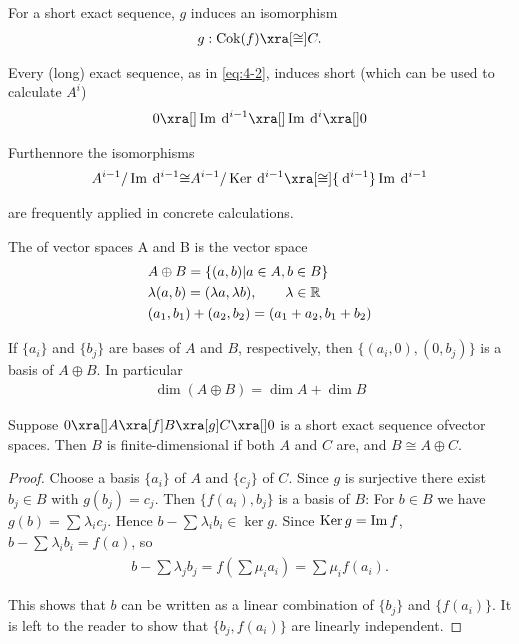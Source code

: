 For a short exact sequence, $g$ induces an isomorphism
\begin{align*}
  g:\cok(f) \xra[\cong] C.
\end{align*}

Every (long) exact sequence, as in \eqref{eq:4-2}, induces short  (which can
be used to calculate $A^i$)
\begin{align*}
  0\xra[] \im\dd^{i-1} \xra[] \im\dd^i \xra[] 0
\end{align*}

Furthennore the isomorphisms
\begin{align*}
  A^{i-1}/\im\dd^{i-1} {\cong} A^{i-1}/\ker\dd^{i-1} \xra[\cong]{\dd^{i-1}} \im\dd^{i-1}
\end{align*}

are frequently applied in concrete calculations.

The  of vector spaces A and B is the vector space
\begin{align*}
   & A\oplus B  = \{(a,b) | a\in A, b\in B\}                       \\
   & \lambda(a, b)  = (\lambda a, \lambda b), \qquad \lambda\in\mathbb{R} \\
   & (a_1, b_1) + (a_2, b_2)  = (a_1 + a_2, b_1 + b_2)
\end{align*}

If $\{a_i\}$ and $\{b_j\}$ are bases of $A$ and $B$, respectively, then $\{(a_i, 0), (0, b_j)\}$ is a
basis of $A\oplus B$. In particular
\begin{align*}
  \dim(A\oplus B) = \dim A + \dim B
\end{align*}

\begin{lemma}\label{lemma:4-1}
  Suppose $0\xra[]A\xra[f]B\xra[g]C\xra[]0$ is a short exact sequence ofvector
  spaces. Then $B$ is finite-dimensional if both $A$ and $C$ are, and $B\cong A\oplus C$.
\end{lemma}

\begin{proof}
  Choose a basis $\{a_i\}$ of $A$ and $\{c_j\}$ of $C$. Since $g$ is surjective there
  exist $b_j\in B$ with $g(b_j) = c_j$. Then $\{f(a_i), b_j\}$ is a basis of $B$: For $b\in B$
  we have $g(b) = \sum_{}^{}{\lambda_ic_j}$. Hence $b - \sum_{}^{}{\lambda_ib_i}\in\ker g$. Since
  $\operatorname{Ker} g= \operatorname{Im} f$, $b - \sum_{}^{}{\lambda_ib_i} = f(a)$, so
  \begin{align*}
    b-\sum\lambda_jb_j=f\left(\sum\mu_ia_i\right)=\sum\mu_if(a_i).
  \end{align*}

  This shows that $b$ can be written as a linear combination of $\{b_j\}$ and $\{f(a_i)\}$. It
  is left to the reader to show that $\{b_j, f(a_i)\}$ are linearly independent.
\end{proof}

